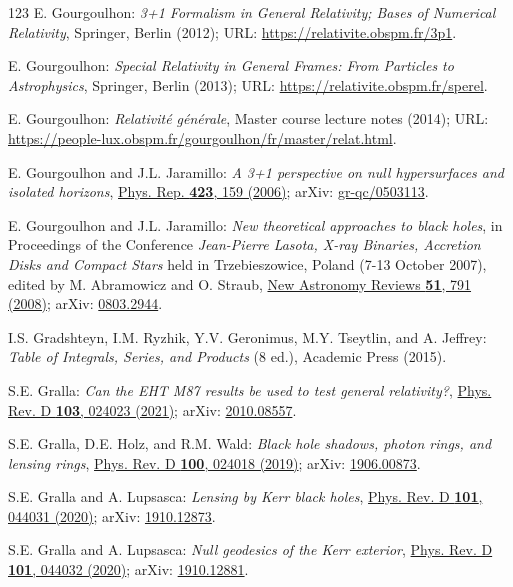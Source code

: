 \begin{thebibliography}{123}
E. Gourgoulhon:
{\em 3+1 Formalism in General Relativity; Bases of Numerical Relativity},
Springer, Berlin (2012);
URL: \url{https://relativite.obspm.fr/3p1}.

E. Gourgoulhon:
{\em Special Relativity in General Frames: From Particles to Astrophysics},
Springer, Berlin (2013);
URL: \url{https://relativite.obspm.fr/sperel}.

E. Gourgoulhon:
{\em Relativité générale},
Master course lecture notes (2014);
URL: \url{https://people-lux.obspm.fr/gourgoulhon/fr/master/relat.html}.

E. Gourgoulhon and J.L. Jaramillo:
{\em A 3+1 perspective on null hypersurfaces and isolated horizons},
\href{https://doi.org/10.1016/j.physrep.2005.10.005}{Phys. Rep. {\bf 423}, 159 (2006)};
arXiv: \href{https://arxiv.org/abs/gr-qc/0503113}{gr-qc/0503113}.

E. Gourgoulhon and J.L. Jaramillo:
{\em New theoretical approaches to black holes},
in Proceedings of the Conference {\em Jean-Pierre Lasota, X-ray Binaries, Accretion Disks and Compact Stars} held in Trzebieszowice, Poland (7-13 October 2007), edited by M. Abramowicz and O. Straub, \href{https://doi.org/10.1016/j.newar.2008.03.026}{New Astronomy Reviews {\bf 51}, 791 (2008)};
arXiv: \href{https://arxiv.org/abs/0803.2944}{0803.2944}.

I.S. Gradshteyn, I.M. Ryzhik, Y.V. Geronimus, M.Y. Tseytlin, and A. Jeffrey:
{\em  Table of Integrals, Series, and Products} (8 ed.),
Academic Press (2015).

S.E. Gralla:
{\em Can the EHT M87 results be used to test general relativity?},
\href{https://doi.org/10.1103/PhysRevD.103.024023}{Phys. Rev. D {\bf 103}, 024023 (2021)};
arXiv: \href{https://arxiv.org/abs/2010.08557}{2010.08557}.

S.E. Gralla, D.E. Holz, and R.M. Wald:
{\em Black hole shadows, photon rings, and lensing rings},
\href{https://doi.org/10.1103/PhysRevD.100.024018}{Phys. Rev. D {\bf 100}, 024018 (2019)};
arXiv: \href{https://arxiv.org/abs/1906.00873}{1906.00873}.

S.E. Gralla and A. Lupsasca:
{\em Lensing by Kerr black holes},
\href{https://doi.org/10.1103/PhysRevD.101.044031}{Phys. Rev. D {\bf 101}, 044031 (2020)};
arXiv: \href{https://arxiv.org/abs/1910.12873}{1910.12873}.

S.E. Gralla and A. Lupsasca:
{\em Null geodesics of the Kerr exterior},
\href{https://doi.org/10.1103/PhysRevD.101.044032}{Phys. Rev. D {\bf 101}, 044032 (2020)};
arXiv: \href{https://arxiv.org/abs/1910.12881}{1910.12881}.


\end{thebibliography}
